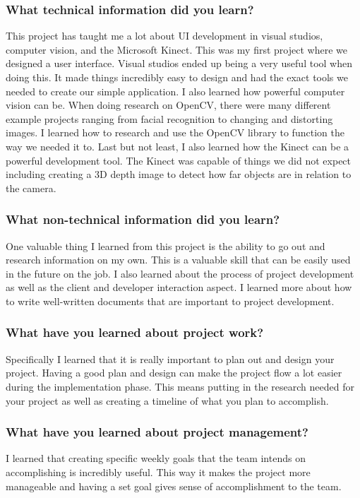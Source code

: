 \documentclass[onecolumn, draftclsnofoot,10pt, compsoc]{IEEEtran}
\begin{document}
\subsubsection{What technical information did you learn?}
This project has taught me a lot about UI development in visual studios, computer vision, and the Microsoft Kinect. This was my first project where we designed a user interface. Visual studios ended up being a very useful tool when doing this. It made things incredibly easy to design and had the exact tools we needed to create our simple application. I also learned how powerful computer vision can be. When doing research on OpenCV, there were many different example projects ranging from facial recognition to changing and distorting images. I learned how to research and use the OpenCV library to function the way we needed it to. Last but not least, I also learned how the Kinect can be a powerful development tool. The Kinect was capable of things we did not expect including creating a 3D depth image to detect how far objects are in relation to the camera.

\subsubsection{What non-technical information did you learn?}
One valuable thing I learned from this project is the ability to go out and research information on my own. This is a valuable skill that can be easily used in the future on the job. I also learned about the process of project development as well as the client and developer interaction aspect. I learned more about how to write well-written documents that are important to project development.

\subsubsection{What have you learned about project work?}
Specifically I learned that it is really important to plan out and design your project. Having a good plan and design can make the project flow a lot easier during the implementation phase. This means putting in the research needed for your project as well as creating a timeline of what you plan to accomplish.

\subsubsection{What have you learned about project management?}
I learned that creating specific weekly goals that the team intends on accomplishing is incredibly useful. This way it makes the project more manageable and having a set goal gives sense of accomplishment to the team.
\end{document}
